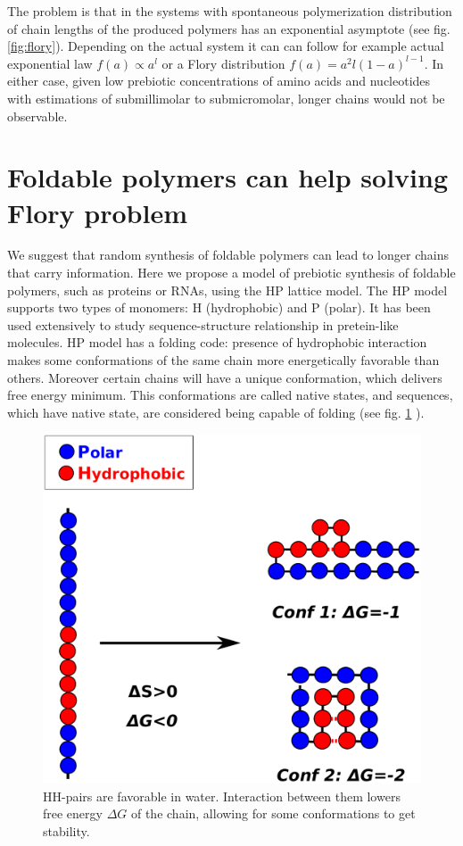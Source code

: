 \documentclass[journal=jacsat,manuscript=article,layout=twocolumn]{achemso}
\newcommand*{\gD}{\Delta}
\begin{document}
The problem is that in the systems with spontaneous polymerization distribution of chain lengths 
of the produced polymers has an exponential asymptote  (see fig. \ref{fig:flory}). Depending on the 
actual system it can can follow for example actual exponential 
law  $f(a)\propto a^l$\cite{nowak2008prevolutionary,Derr2012} or a Flory distribution 
$f(a)=a^2l(1-a)^{l-1}$\cite{Flory1953}.
In either case, given low prebiotic concentrations of amino acids and nucleotides with estimations 
of submillimolar to submicromolar\cite{Aubrey2009,Kanavarioti2001,Lazcano1996}, longer chains 
would not be observable.



\section{Foldable polymers can help solving Flory problem}
We suggest that random synthesis of foldable polymers can lead to longer chains that carry 
information.
Here we propose a model of prebiotic synthesis of foldable polymers, such as proteins or RNAs, 
using the HP lattice model\cite{lau1989lattice,Chan1991,Miller1995,Yue1995,agarwala1997local}. The 
HP model supports two types of monomers: H (hydrophobic) and P (polar). It has been used 
extensively to study sequence-structure relationship in pretein-like molecules. HP model has a 
folding code: presence of hydrophobic interaction makes some conformations 
of the same chain more energetically favorable than others. Moreover certain chains will have a 
unique conformation, which delivers free energy minimum. This conformations are called native 
states, and sequences, which have native state, are considered being capable of folding (see fig. 
\ref{fig:hydro-effect} ).

\begin{figure}[h!]
  \centering
  \includegraphics[width=\columnwidth]{pictures/hp-model.pdf} 
  \caption{HH-pairs are favorable in water. Interaction between them lowers free energy $\gD G$ of 
the chain, allowing for some conformations to get stability.}
  \label{fig:hydro-effect}
\end{figure}
\end{document}
